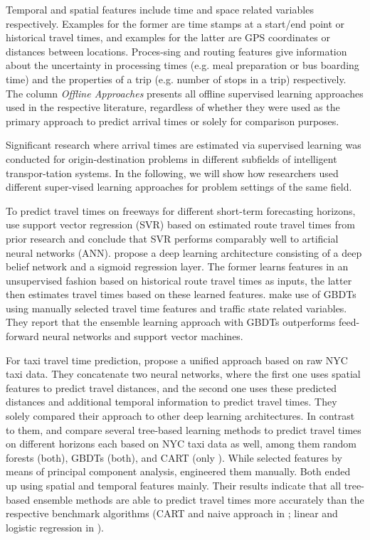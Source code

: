 Temporal and spatial features include time and space related variables respectively. Examples for the former are time stamps at a start/end point or historical travel times, and examples for the latter are GPS coordinates or distances between locations. Proces-sing and routing features give information about the uncertainty in processing times (e.g. meal preparation or bus boarding time) and the properties of a trip (e.g. number of stops in a trip) respectively. 
The column \textit{Offline Approaches} presents all offline supervised learning approaches used in the respective literature, regardless of whether they were used as the primary approach to predict arrival times or solely for comparison purposes.

Significant research where arrival times are estimated via supervised learning was conducted for origin-destination problems in different subfields of intelligent transpor-tation systems. In the following, we will show how researchers used different super-vised learning approaches for problem settings of the same field. 

To predict travel times on freeways for different short-term forecasting horizons, \citet{Vanajakshi2007} use support vector regression (SVR) based on estimated route travel times from prior research and conclude that SVR performs comparably well to artificial neural networks (ANN).
\citet{Siripanpornchana2016_AnnWithDbnFS} propose a deep learning architecture consisting of a deep belief network and a sigmoid regression layer. The former learns features in an unsupervised fashion based on historical route travel times as inputs, the latter then estimates travel times based on these learned features. \citet{Cheng2019_GBDT} make use of GBDTs using manually selected travel time features and traffic state related variables. They report that the ensemble learning approach with GBDTs outperforms feed-forward
neural networks and support vector machines.

For taxi travel time prediction, \citet{jindal2017unified} propose a unified approach based on raw NYC taxi data. They concatenate two neural networks, where the first one uses spatial features to predict travel distances, and the second one uses these predicted distances and additional temporal information to predict travel times. They solely compared their approach to other deep learning architectures.
In contrast to them, \citet{Huang2018_GBDT} and \citet{huang2020travel_GBDT} compare several tree-based learning methods to predict travel times on different horizons each based on NYC taxi data as well, among them random forests (both), GBDTs (both), and CART (only \citet{huang2020travel_GBDT}). While \citet{Huang2018_GBDT} selected features by means of principal component analysis, \citet{huang2020travel_GBDT} engineered them manually. Both ended up using spatial and temporal features mainly. Their results indicate that all tree-based ensemble methods are able to predict travel times more accurately than the respective benchmark algorithms (CART and naive approach in \citet{huang2020travel_GBDT}; linear and logistic regression in \citet{Huang2018_GBDT}).

